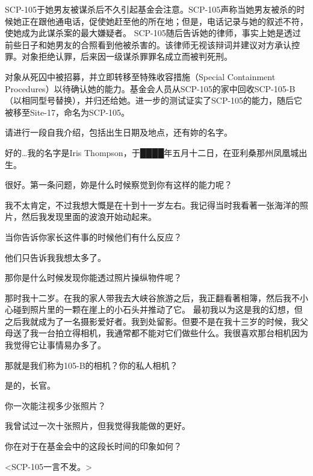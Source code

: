 SCP-105于她男友被谋杀后不久引起基金会注意。SCP-105声称当她男友被杀的时候她正在跟他通电话，促使她赶至他的所在地；但是，电话记录与她的叙述不符，使她成为此谋杀案的最大嫌疑者。 SCP-105随后告诉她的律师，事实上她是透过前些日子和她男友的合照看到他被杀害的。该律师无视该辩词并建议对方承认控罪。对象拒绝认罪，后来因一级谋杀罪罪名成立而被判死刑。

对象从死囚中被招募，并立即转移至特殊收容措施（Special Containment Procedures）以待确认她的能力。基金会人员从SCP-105的家中回收SCP-105-B（以相同型号替换），并归还给她。进一步的测试证实了SCP-105的能力，随后它被移至Site-17，命名为SCP-105。


\begin{scpbox}


请进行一段自我介绍，包括出生日期及地点，还有妳的名字。

好的…我的名字是Iris Thompson，于████年五月十二日，在亚利桑那州凤凰城出生。

很好。第一条问题，妳是什么时候察觉到你有这样的能力呢？

我不太肯定，不过我想大慨是在十到十一岁左右。我记得当时我看著一张海洋的照片，然后我发现里面的波浪开始动起来。

当你告诉你家长这件事的时候他们有什么反应？

他们只告诉我我想太多了。

那你是什么时候发现你能透过照片操纵物件呢？

那时我十二岁。在我的家人带我去大峡谷旅游之后，我正翻看著相簿，然后我不小心碰到照片里的一颗在崖上的小石头并推动了它。 最初我以为这是我的幻想，但之后我就成为了一名摄影爱好者。我到处留影。但要不是在我十三岁的时候，我父母送了我一台拍立得相机，我通常都不能对它们做些什么。我很喜欢那台相机因为我觉得它让事情易办多了。

那就是我们称为105-B的相机？你的私人相机？

是的，长官。

你一次能注视多少张照片？

我曾试过一次十张照片，但我觉得我能做的更好。

你在对于在基金会中的这段长时间的印象如何？

<SCP-105一言不发。>


\end{scpbox}
